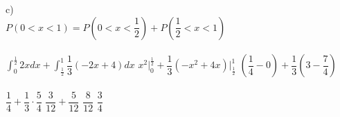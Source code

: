 \documentclass[12pt]{article}
\begin{document}
\noindent c)\\

$P(0<x<1)=P\left( 0<x<\dfrac{1}{2}\right)+P\left(\dfrac{1}{2}<x<1\right)$\\\\

$\displaystyle\int_{0}^{\frac{1}{2}}2xdx+\int_{\frac{1}{2}}^{1}\dfrac{1}{3}(-2x+4)dx$\qquad\qquad
$x^{2}\biggr|^{\frac{1}{2}}_{0}+\dfrac{1}{3}(-x^2+4x)\biggr|^{1}_{\frac{1}{2}}$\qquad\qquad
$\left(\dfrac{1}{4}-0\right)+\dfrac{1}{3}\left(3-\dfrac{7}{4}\right)$\\\\

$\dfrac{1}{4}+\dfrac{1}{3}\cdot\dfrac{5}{4}$\qquad\qquad
$\dfrac{3}{12}+\dfrac{5}{12}$\qquad\qquad
$\dfrac{8}{12}$\qquad\qquad
$\dfrac{3}{4}$\\

	
	
	
	
	
	
	
	
	
	
	
\end{document}

